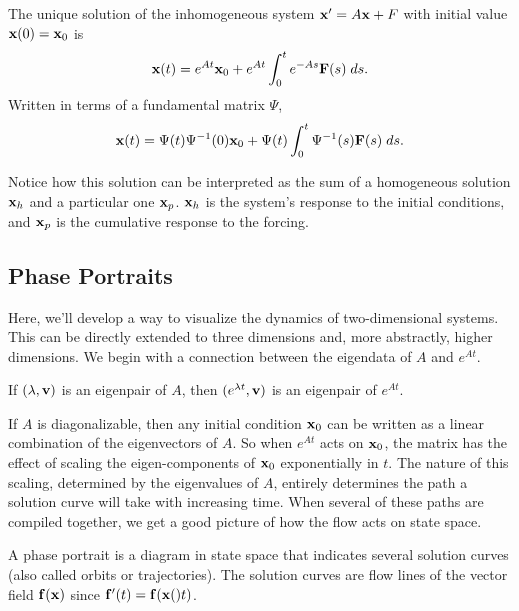 \documentclass[../m082main.tex]{subfiles}
\begin{document}
\begin{theorem}
    The unique solution of the inhomogeneous system $\mathbf{x}' = A \mathbf{x} + F$ with initial value $\mathbf{x}(0) = \mathbf{x}_0$ is
    \[ \mathbf{x}(t) = e^{At} \mathbf{x}_0 + e^{At} \int_0^t e^{-As} \mathbf{F}(s) \;ds. \]
    Written in terms of a fundamental matrix $\Psi$,
    \[ \mathbf{x}(t) = \Psi(t) \Psi^{-1}(0) \mathbf{x}_0 + \Psi(t) \int_0^t \Psi^{-1}(s) \mathbf{F}(s) \;ds. \]
\end{theorem}

Notice how this solution can be interpreted as the sum of a homogeneous solution $\mathbf{x}_h$ and a particular one $\mathbf{x}_p$.
$\mathbf{x}_h$ is the system's response to the initial conditions, and $\mathbf{x}_p$ is the cumulative response to the forcing.

\subsection{Phase Portraits}
Here, we'll develop a way to visualize the dynamics of two-dimensional systems.
This can be directly extended to three dimensions and, more abstractly, higher dimensions.
We begin with a connection between the eigendata of $A$ and $e^{At}$.

\begin{theorem}
    If $(\lambda, \mathbf{v})$ is an eigenpair of $A$, then $(e^{\lambda t}, \mathbf{v})$ is an eigenpair of $e^{At}$.
\end{theorem}

If $A$ is diagonalizable, then any initial condition $\mathbf{x}_0$ can be written as a linear combination of the eigenvectors of $A$.
So when $e^{At}$ acts on $\mathbf{x}_0$, the matrix has the effect of scaling the eigen-components of $\mathbf{x}_0$ exponentially in $t$.
The nature of this scaling, determined by the eigenvalues of $A$, entirely determines the path a solution curve will take with increasing time.
When several of these paths are compiled together, we get a good picture of how the flow acts on state space.

\begin{definition}
    A phase portrait is a diagram in state space that indicates several solution curves (also called orbits or trajectories).
    The solution curves are flow lines of the vector field $\mathbf{f}(\mathbf{x})$ since $\mathbf{f}'(t) = \mathbf{f}(\mathbf{x}()t)$.
\end{definition}
\end{document}
